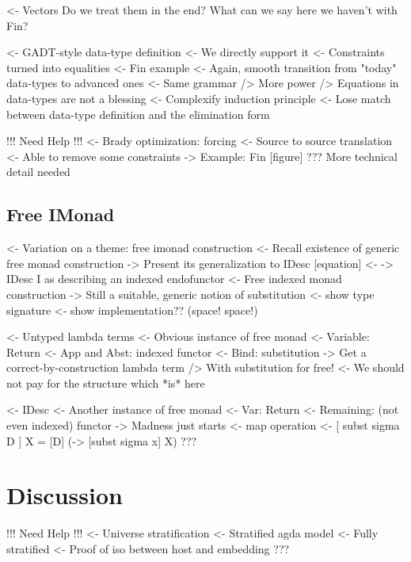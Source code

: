 \documentclass{article}
\newenvironment{structure}{\footnotesize\verbatim}{\endverbatim}
\begin{document}
\begin{structure}
<- Vectors
    Do we treat them in the end? 
    What can we say here we haven't with Fin?
\end{structure}

\begin{structure}
<- GADT-style data-type definition
    <- We directly support it
        <- Constraints turned into equalities
            <- Fin example
    <- Again, smooth transition from "today" data-types to advanced ones
        <- Same grammar
        /> More power
    /> Equations in data-types are not a blessing
        <- Complexify induction principle
        <- Lose match between data-type definition and the elimination form
\end{structure}

\begin{structure}
!!! Need Help !!!
<- Brady optimization: forcing
    <- Source to source translation
    <- Able to remove some constraints
    -> Example: Fin [figure]
    ??? More technical detail needed
\end{structure}

\subsection{Free IMonad}

\begin{structure}
<- Variation on a theme: free imonad construction
    <- Recall existence of generic free monad construction
    -> Present its generalization to IDesc [equation]
        <- \I -> IDesc I as describing an indexed endofunctor
        <- Free indexed monad construction
    -> Still a suitable, generic notion of substitution
        <- show type signature
        <- show implementation?? (space! space!)
\end{structure}

\begin{structure}
<- Untyped lambda terms
    <- Obvious instance of free monad
        <- Variable: Return
        <- App and Abst: indexed functor
        <- Bind: substitution
    -> Get a correct-by-construction lambda term
        /> With substitution for free!
        <- We should not pay for the structure which *is* here
\end{structure}

\begin{structure}
<- IDesc
    <- Another instance of free monad
        <- Var: Return
        <- Remaining: (not even indexed) functor
    -> Madness just starts
        <- map operation
        <- [ subst sigma D ] X = [D] (\x -> [subst sigma x] X)
        ???
\end{structure}

\section{Discussion}

\begin{structure}
!!! Need Help !!!
<- Universe stratification
    <- Stratified agda model
        <- Fully stratified
        <- Proof of iso between host and embedding
    ???
\end{structure}
\end{document}
